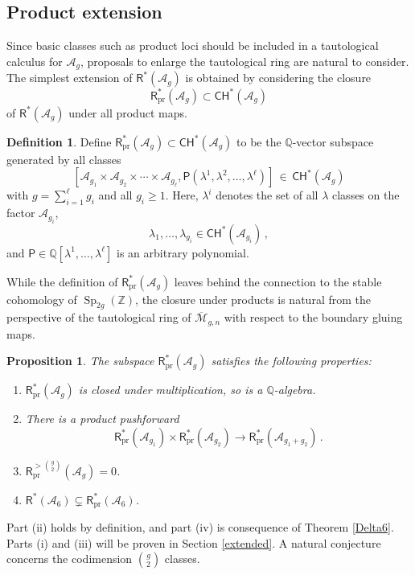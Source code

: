\documentclass[11pt]{amsart}
\newtheorem{prop}[thm]{Proposition}
\theoremstyle{definition}
\newtheorem{definition}[thm]{Definition}
\newcommand{\qq}{\mathbb{Q}}
\newcommand{\A}{\mathcal{A}}
\newcommand{\CH}{\mathsf{CH}}
\DeclareMathOperator{\Sp}{Sp}
\begin{document}
\subsection{Product extension}
Since basic classes such as product loci
should be included in
a tautological calculus for
$\mathcal{A}_g$, proposals
to enlarge the tautological
ring are natural to consider.
The simplest extension of $\mathsf{R}^*(\mathcal{A}_g)$  is obtained by considering the
closure 
$$\mathsf{R}^*_{\mathrm{pr}}(\mathcal{A}_g)
\subset \CH^*(\mathcal{A}_g)$$
of $\mathsf{R}^*(\mathcal{A}_g)$
under all product maps. 


\begin{definition}\label{rprod}
    Define 
$\mathsf{R}^*_{\mathrm{pr}}(\mathcal{A}_g)
\subset \CH^*(\mathcal{A}_g)
$
to be the $\qq$-vector subspace generated by
all classes
$$[\mathcal{A}_{g_1} \times \mathcal{A}_{g_2} \times \cdots \times \mathcal{A}_{g_\ell}, \mathsf{P}(\lambda^1,\lambda^2, \ldots, \lambda^\ell)]\, 
\in\,  \CH^*(\mathcal{A}_g)
$$
with $g=\sum_{i=1}^\ell g_i$ and all $g_i\geq 1$. Here,
$\lambda^i$ denotes the set of all $\lambda$ classes on the factor $\A_{g_i}$,
$$\lambda_1, \ldots, \lambda_{g_i}\in \CH^*(\mathcal{A}_{g_i})\,, $$
and 
$\mathsf{P}\in \qq[\lambda^1,\ldots, \lambda^\ell]$
is an arbitrary polynomial.
\end{definition}

While the definition of $\mathsf{R}^*_{\mathrm{pr}}(\mathcal{A}_g)$
leaves behind the connection to the
stable cohomology of
$\Sp_{2g}(\mathbb Z)$, the closure under
products is natural from the perspective of the tautological ring
of $\overline{\mathcal{M}}_{g,n}$ with
respect to the boundary gluing maps.


\begin{prop}\label{p10} The subspace $\mathsf{R}^*_{\mathrm{pr}}(\mathcal{A}_g)$ satisfies the following properties:
\begin{enumerate}
\item[\textnormal{(i)}] 
$\mathsf{R}^*_{\mathrm{pr}}(\mathcal{A}_g)$ is closed under multiplication, so is a $\qq$-algebra.
\item[\textnormal{(ii)}]   There is a product pushforward
$$\mathsf{R}^*_{\mathrm{pr}}(\mathcal{A}_{g_1})
\times 
\mathsf{R}^*_{\mathrm{pr}}(\mathcal{A}_{g_2})
\rightarrow 
\mathsf{R}^*_{\mathrm{pr}}(\mathcal{A}_{g_1+g_2})\, .$$
\item[\textnormal{(iii)}] $\mathsf{R}^{>\binom{g}{2}}_{\mathrm{pr}}(\mathcal{A}_{g}) =0$.
\item[\textnormal{(iv)}] 
$\mathsf{R}^*(\mathcal{A}_{6}) \subsetneq
\mathsf{R}^*_{\mathrm{pr}}(\mathcal{A}_{6})$.
\end{enumerate}
\end{prop}
Part (ii) holds by definition, and part (iv) is
consequence of Theorem \ref{Delta6}. Parts (i) and (iii)
will be proven in Section \ref{extended}. A natural conjecture concerns the
codimension $\binom{g}{2}$ classes.
\end{document}
